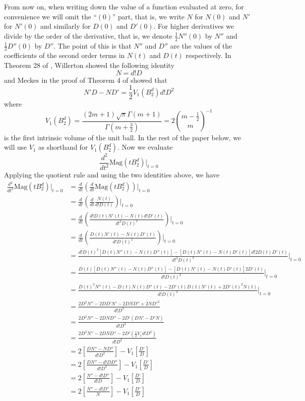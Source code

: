 \documentclass[11pt]{article}
\theoremstyle{definition}
\theoremstyle{definition}
\theoremstyle{plain}
\theoremstyle{plain}
\theoremstyle{plain}
\theoremstyle{definition}
\begin{document}
From now on, when writing down the value of a function evaluated at zero, for convenience we will omit the ``$(0)$'' part, that is, we write $N$ for $N(0)$ and $N'$ for $N'(0)$ and similarly for $D(0)$ and $D'(0)$. For higher derivatives we divide by the order of the derivative, that is, we denote $\frac{1}{2}N''(0)$ by $N''$ and $\frac{1}{2}D''(0)$ by $D''$. The point of this is that $N''$ and $D''$ are the values of the coefficients of the second order terms in $N(t)$ and $D(t)$ respectively. In Theorem 28 of \cite{willerton_magnitude_2017}, Willerton showed the following identity
\begin{equation*}
N = d!D
\end{equation*}
and Meckes in the proof of Theorem 4 of \cite{meckes_magnitude_2019} showed that
\begin{equation*}
N'D - ND' = \frac{1}{2}V_1\left(B_2^d\right)d!D^2
\end{equation*}
where
\begin{equation*}
V_1\left(B_2^d\right) = \frac{(2m+1)\sqrt{\pi}\Gamma(m+1)}{\Gamma\left(m+\frac{3}{2}\right)} = 2\binom{m-\frac{1}{2}}{m}^{-1}
\end{equation*}
is the first intrinsic volume of the unit ball. In the rest of the paper below, we will use $V_1$ as shorthand for $V_1\left(B_2^d\right)$.
Now we evaluate
\begin{equation*}
\frac{d^2}{dt^2}\text{Mag}(tB_2^d)\big\vert_{t=0}
\end{equation*}
Applying the quotient rule and using the two identities above, we have
\begin{align*}
\frac{d^2}{dt^2}\text{Mag}(tB_2^d)\big\vert_{t=0} &= \frac{d}{dt}\left(\frac{d}{dt}\text{Mag}(tB_2^d)\right)\big\vert_{t=0} \\
&= \frac{d}{dt}\left(\frac{d}{dt}\frac{N(t)}{d!D(t)}\right)\big\vert_{t=0} \\
&= \frac{d}{dt}\left(\frac{d!D(t)N'(t)-N(t)d!D'(t)}{d!^2D(t)^2}\right)\big\vert_{t=0} \\
&= \frac{d}{dt}\left(\frac{D(t)N'(t)-N(t)D'(t)}{d!D(t)^2}\right)\big\vert_{t=0} \\
&= \frac{d!D(t)^2[D(t)N''(t)-N(t)D''(t)]-[D(t)N'(t)-N(t)D'(t)]d!2D(t)D'(t)}{d!^2D(t)^4}\big\vert_{t=0} \\
&= \frac{D(t)[D(t)N''(t)-N(t)D''(t)]-[D(t)N'(t)-N(t)D'(t)]2D'(t)}{d!D(t)^3}\big\vert_{t=0} \\
&= \frac{D(t)^2N''(t)-D(t)N(t)D''(t)-2D'(t)D(t)N'(t)+2D'(t)^2N(t)}{d!D(t)^3}\big\vert_{t=0} \\
&= \frac{2D^2N''-2DD'N'-2DND''+2ND'^2}{d!D^3} \\
&= \frac{2D^2N''-2DND''-2D'(DN'-D'N)}{d!D^3} \\
&= \frac{2D^2N''-2DND''-2D'(\frac{1}{2}V_1d!D^2)}{d!D^3} \\
&= 2\left[\frac{DN''-ND''}{d!D^2}\right]-V_1\left[\frac{D'}{D}\right] \\
&= 2\left[\frac{DN''-d!DD''}{d!D^2}\right] - V_1\left[\frac{D'}{D}\right] \\
&= 2\left[\frac{N''-d!D''}{d!D}\right] - V_1\left[\frac{D'}{D}\right] \\
&= 2\left[\frac{N''-d!D''}{N}\right] - V_1\left[\frac{D'}{D}\right]
\end{align*}
\end{document}

